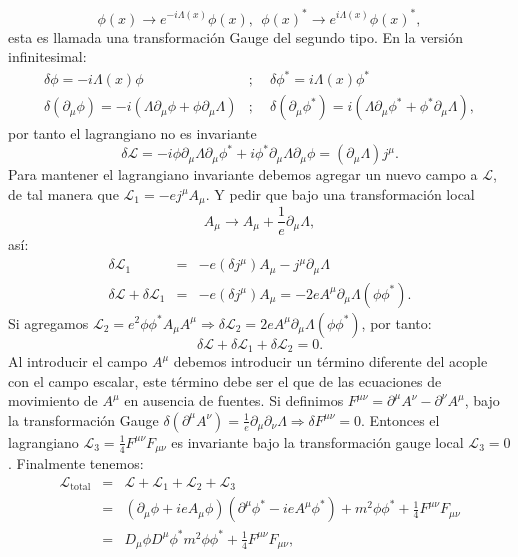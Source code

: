 \begin{equation}
\phi(x)\to e^{-i\Lambda(x)}\phi(x),\ \ \phi(x)^{*}\to e^{i\Lambda(x)}\phi(x)^{*},
\end{equation}
esta es llamada una transformación Gauge del segundo tipo. En la versión infinitesimal:
\begin{eqnarray}
\nonumber \delta\phi=-i\Lambda(x)\phi &;&\ \ \delta\phi^{*}=i\Lambda(x)\phi^{*}\\
\delta(\partial_{\mu}\phi)=-i(\Lambda\partial_{\mu}\phi+\phi\partial_{\mu}\Lambda)&;&\ \ \delta(\partial_{\mu}\phi^{*})=i(\Lambda\partial_{\mu}\phi^{*}+\phi^{*}\partial_{\mu}\Lambda),
\end{eqnarray}
por tanto el lagrangiano no es invariante
\begin{equation}
\delta\mathcal{L}=-i\phi\partial_{\mu}\Lambda\partial_{\mu}\phi^{*}+i\phi^{*}\partial_{\mu}\Lambda\partial_{\mu}\phi=(\partial_{\mu}\Lambda)j^{\mu}.
\end{equation}
Para mantener el lagrangiano invariante debemos agregar un nuevo campo a $\mathcal{L}$, de tal manera que $\mathcal{L}_1=-ej^\mu A_\mu$. Y pedir que bajo una transformación local 
\begin{equation}
A_\mu \to A_\mu +\frac{1}{e}\partial_\mu\Lambda,
\end{equation} 
así:
\begin{eqnarray}
\nonumber \delta\mathcal{L}_{1}&=&-e(\delta j^{\mu})A_{\mu}-j^{\mu}\partial_{\mu}\Lambda\\
\delta\mathcal{L}+\delta\mathcal{L}_{1}&=&-e(\delta j^{\mu})A_{\mu}=-2eA^{\mu}\partial_{\mu}\Lambda(\phi\phi^{*}).
\end{eqnarray}
Si agregamos $\mathcal{L}_2=e^2\phi\phi^{*}A_\mu A^\mu\Rightarrow \delta\mathcal{L}_2=2eA^{\mu}\partial_{\mu}\Lambda(\phi\phi^{*})$, por tanto:
\begin{equation}
\delta\mathcal{L}+\delta\mathcal{L}_1+\delta\mathcal{L}_2=0.
\end{equation}
Al introducir el campo $ A^\mu$ debemos introducir un término diferente del acople con el campo escalar, este término debe ser el que de las ecuaciones de movimiento de $ A^\mu$ en ausencia de fuentes. Si definimos $F^{\mu\nu}=\partial^{\mu}A^{\nu}-\partial^{\nu}A^{\mu}$, bajo la transformación Gauge $\delta(\partial^{\mu}A^{\nu})=\frac{1}{e}\partial_{\mu}\partial_{\nu}\Lambda\Rightarrow\delta F^{\mu\nu}=0$. Entonces el lagrangiano $\mathcal{L}_{3}=\frac{1}{4}F^{\mu\nu}F_{\mu\nu}$ es invariante bajo la transformación gauge local $\mathcal{L}_3=0$. Finalmente tenemos:
\begin{eqnarray}
\nonumber\mathcal{L}_{\text{total}}&=&\mathcal{L}+\mathcal{L}_1+\mathcal{L}_2+\mathcal{L}_3\\
\nonumber &=& (\partial_{\mu}\phi+ieA_{\mu}\phi)(\partial^{\mu}\phi^{*}-ieA^{\mu}\phi^{*})+m^{2}\phi\phi^{*}+\frac{1}{4}F^{\mu\nu}F_{\mu\nu}\\
&=& D_{\mu}\phi D^{\mu}\phi^{*}m^{2}\phi\phi^{*}+\frac{1}{4}F^{\mu\nu}F_{\mu\nu},
\end{eqnarray}
